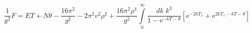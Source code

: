 \begin{equation}
\label{3-9}
\frac{1}{g^2}F = ET + N\theta - \frac{16\pi^2}{g^2} -
2\pi^2 v^2\rho^2 + \frac{16\pi^2\rho^4}{g^2} \int\limits_0^\infty \frac{dk \;k^3}
{1 - \mathrm{e}^{-kT-\theta}}\left[\mathrm{e}^{-2kT_1}+ 
\mathrm{e}^{2kT_1 - kT - \theta}\right]
\end{equation}

